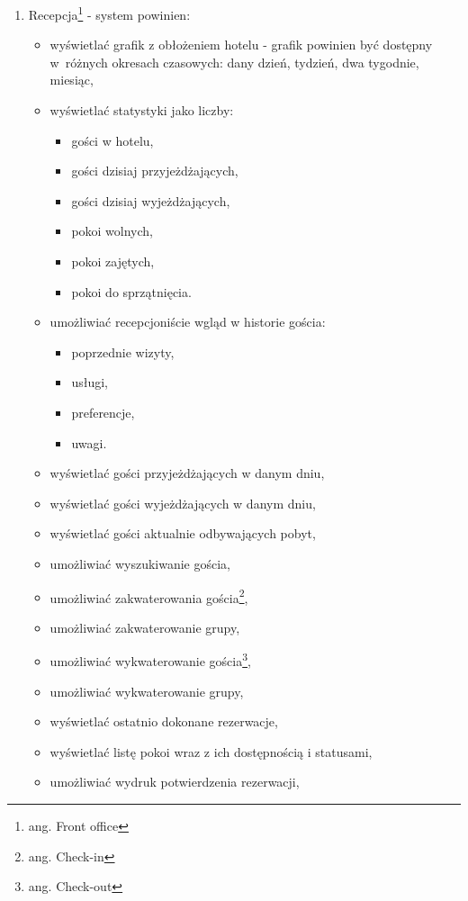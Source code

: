 \documentclass[a4paper,onecolumn,oneside,11pt,wide,floatssmall]{mwrep}
\theoremstyle{definition}
\theoremstyle{plain}%
\theoremstyle{remark}
\begin{document}
\begin{enumerate}
\begin{itemize}
    \end{itemize}
  \item Recepcja\footnote{ang. Front office} - system powinien:
    \begin{itemize}
      \item wyświetlać grafik z obłożeniem hotelu - grafik powinien być dostępny \mbox{w różnych} okresach czasowych: dany dzień, tydzień, dwa tygodnie, miesiąc,
      \item wyświetlać statystyki jako liczby:
        \begin{itemize}
          \item gości w hotelu,
          \item gości dzisiaj przyjeżdżających,
          \item gości dzisiaj wyjeżdżających,
          \item pokoi wolnych,
          \item pokoi zajętych,
          \item pokoi do sprzątnięcia.
        \end{itemize}
      \item umożliwiać recepcjoniście wgląd w historie gościa:
        \begin{itemize}
          \item poprzednie wizyty,
          \item usługi,
          \item preferencje,
          \item uwagi.
        \end{itemize}
      \item wyświetlać gości przyjeżdżających w danym dniu,
      \item wyświetlać gości wyjeżdżających w danym dniu,
      \item wyświetlać gości aktualnie odbywających pobyt,
      \item umożliwiać wyszukiwanie gościa,
      \item umożliwiać zakwaterowania gościa\footnote{ang. Check-in},
      \item umożliwiać zakwaterowanie grupy,
      \item umożliwiać wykwaterowanie gościa\footnote{ang. Check-out},
      \item umożliwiać wykwaterowanie grupy,
      \item wyświetlać ostatnio dokonane rezerwacje,
      \item wyświetlać listę pokoi wraz z ich dostępnością i statusami,
      \item umożliwiać wydruk potwierdzenia rezerwacji,

\end{itemize}
\end{enumerate}
\end{document}
